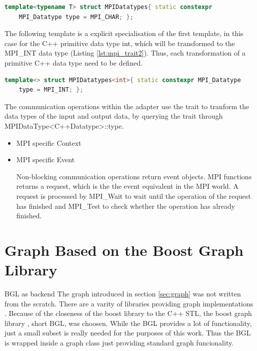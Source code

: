 \begin{lstlisting}[language=C++, label=lst:mpi_trait1]
  template<typename T> struct MPIDatatypes{ static constexpr
    MPI_Datatype type = MPI_CHAR; };
\end{lstlisting}

The following template is a explicit specialisation of the first
template, in this case for the C++ primitive data type int, which will
be transformed to the MPI\_INT data type (Listing
\ref{lst:mpi_trait2}). Thus, each transformation of a primitive C++
data type need to be defined.

\begin{lstlisting}[language=C++, label=lst:mpi_trait2]
  template<> struct MPIDatatypes<int>{ static constexpr MPI_Datatype
    type = MPI_INT; };

\end{lstlisting}

The communication operations within the adapter use the trait to
tranform the data types of the input and output data, by querying the
trait through MPIDataType<C++Datatype>::type.

\begin{itemize}
\item MPI specific Context 
  

\item MPI specific Event

  Non-blocking communication operations return event objects.  MPI
  functions returns a request, which is the the event equivalent in
  the MPI world. A request is processed by MPI\_Wait to wait until the
  operation of the request has finished and MPI\_Test to check whether
  the operation has already finished.

\end{itemize}

\section{Graph Based on the Boost Graph Library}

BGL as backend The graph introduced in section \ref{sec:graph} was not
written from the scratch. There are a varity of libraries providing
graph implementations . Because of the
closeness of the boost library to the C++ STL, the boost graph library
\cite{ref:boost::bgl}, short BGL, was choosen. While the BGL provides
a lot of functionality, just a small subset is really needed for the
purposes of this work. Thus the BGL is wrapped inside a graph class
just providing standard graph funcionality.

